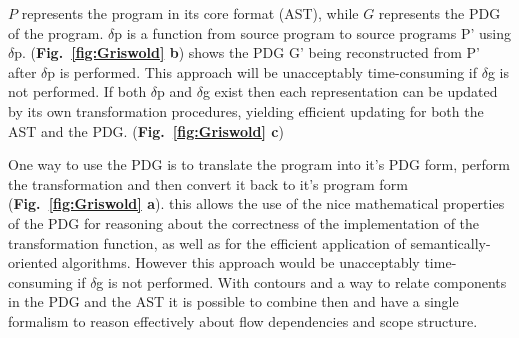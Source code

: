 $P$ represents the program in its core format (AST), while $G$ represents the PDG of the program.
$\delta$p is a function from source program to source programs P' using $\delta$p. 
({\bf Fig.~\ref{fig:Griswold} b}) shows the PDG G' being reconstructed from P' after $\delta$p is performed. 
This approach will be unacceptably time-consuming if $\delta$g is not performed. 
If both $\delta$p and $\delta$g exist then each representation can be updated by its own transformation procedures, yielding efficient updating for both the AST and the PDG. ({\bf Fig.~\ref{fig:Griswold} c})

One way to use the PDG is to translate the program into it’s PDG form, perform the transformation and then convert it back to it’s program form ({\bf Fig.~\ref{fig:Griswold} a}). this allows the use of the nice mathematical properties of the PDG for reasoning about the correctness of the implementation of the transformation function, as well as for the efficient application of semantically-oriented algorithms. However this approach would be unacceptably time-consuming if $\delta$g is not performed. 
With contours and a way to relate components in the PDG and the AST it is possible to combine then and have a single formalism to reason effectively about flow dependencies and scope structure.

